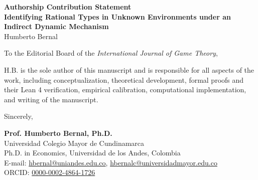 \documentclass[12pt]{article}
\begin{document}
\singlespacing

\begin{center}
\textbf{Authorship Contribution Statement} \\
\vspace{1em}
\textbf{Identifying Rational Types in Unknown Environments under an Indirect Dynamic Mechanism} \\
Humberto Bernal
\end{center}

\vspace{3em}

\noindent To the Editorial Board of the \textit{International Journal of Game Theory},

\vspace{2em}

\noindent H.B. is the sole author of this manuscript and is responsible for all aspects of the work, including conceptualization, theoretical development, formal proofs and their Lean 4 verification, empirical calibration, computational implementation, and writing of the manuscript.

\vspace{4em}

\begin{flushleft}
Sincerely,

\vspace{3em}

\textbf{Prof. Humberto Bernal, Ph.D.} \\
Universidad Colegio Mayor de Cundinamarca \\
Ph.D. in Economics, Universidad de los Andes, Colombia \\
E-mail: \href{mailto:hbernal@uniandes.edu.co}{hbernal@uniandes.edu.co}, \href{mailto:hbernalc@universidadmayor.edu.co}{hbernalc@universidadmayor.edu.co} \\
ORCID: \href{https://orcid.org/0000-0002-4864-1726}{0000-0002-4864-1726}
\end{flushleft}
\end{document}
